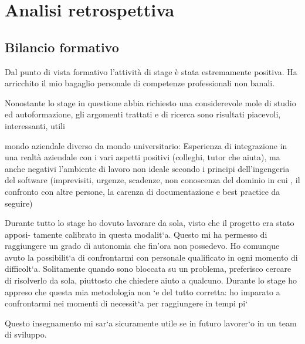 
\chapter{Analisi retrospettiva}
\label{cap:valutazione}


\section{Bilancio formativo}

Dal punto di vista formativo l’attività di stage è stata estremamente positiva. Ha
arricchito il mio bagaglio personale di competenze professionali non banali.

Nonostante lo stage in questione abbia richiesto una considerevole mole di studio ed
autoformazione, gli argomenti trattati e di ricerca sono risultati piacevoli, interessanti,
utili

mondo aziendale diverso da mondo universitario:
Esperienza di integrazione in una realtà aziendale con i vari aspetti positivi (colleghi, tutor che aiuta), ma anche negativi l'ambiente di lavoro non ideale secondo i principi dell'ingengeria del software (imprevisiti, urgenze, scadenze, non conoscenza del dominio in cui , il confronto con altre persone, la carenza di documentazione e best practice da seguire)

Durante tutto lo stage ho dovuto lavorare da sola, visto che il progetto era stato apposi-
tamente calibrato in questa modalit`a. Questo mi ha permesso di raggiungere un grado
di autonomia che fin’ora non possedevo.
Ho comunque avuto la possibilit`a di confrontarmi con personale qualificato in ogni
momento di difficolt`a. Solitamente quando sono bloccata su un problema, preferisco
cercare di risolverlo da sola, piuttosto che chiedere aiuto a qualcuno. Durante lo stage
ho appreso che questa mia metodologia non `e del tutto corretta: ho imparato a confrontarmi nei momenti di necessit`a per raggiungere in tempi pi`

Questo insegnamento mi sar`a sicuramente utile se in futuro lavorer`o in un team di
sviluppo.

